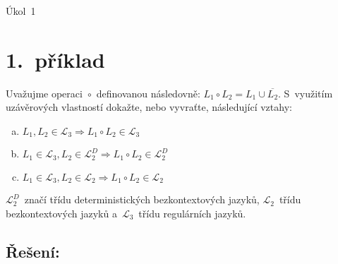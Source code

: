 \documentclass[a4paper, 11pt]{scrartcl}
\newcommand{\NUMBER}{1}
\begin{document}
    \begin{center}
        {\Large Úkol~\NUMBER}
    \end{center}


    \section*{1.~příklad}

    Uvažujme operaci~$ \circ $~definovanou následovně: $ L_1 \circ L_2 = L_1
    \cup \overline{L_2} $. S~využitím uzávěrových vlastností dokažte, nebo
    vyvraťte, následující vztahy:
    \begin{enumerate}[(a)]
        \item
            $ L_1, L_2 \in \mathcal{L}_3 \Rightarrow L_1 \circ L_2 \in
            \mathcal{L}_3 $

        \item
            $ L_1 \in \mathcal{L}_3, L_2 \in \mathcal{L}_2^D \Rightarrow L_1
            \circ L_2 \in \mathcal{L}_2^D $

        \item
            $ L_1 \in \mathcal{L}_3, L_2 \in \mathcal{L}_2 \Rightarrow L_1
            \circ L_2 \in \mathcal{L}_2 $
    \end{enumerate}
    $ \mathcal{L}_2^D $~značí třídu deterministických bezkontextových jazyků,
    $ \mathcal{L}_2 $~třídu bezkontextových jazyků a~$ \mathcal{L}_3 $~třídu
    regulárních jazyků.

    \subsection*{Řešení:}
\end{document}
